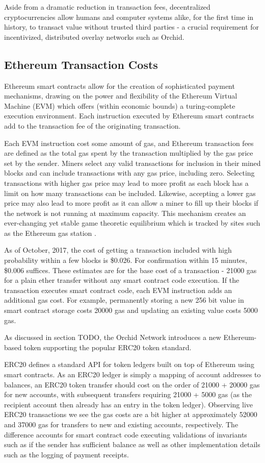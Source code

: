 Aside from a dramatic reduction in transaction fees, decentralized cryptocurrencies allow humans and computer systems alike, for the first time in history, to transact value without trusted third parties - a crucial requirement for incentivized, distributed overlay networks such as Orchid.

\subsection{Ethereum Transaction Costs}

Ethereum smart contracts allow for the creation of sophisticated payment mechanisms, drawing on the power and flexibility of the Ethereum Virtual Machine\cite{EVM} (EVM) which offers (within economic bounds) a turing-complete execution environment. Each instruction executed by Ethereum smart contracts add to the transaction fee of the originating transaction.

Each EVM instruction cost some amount of gas, and Ethereum transaction fees are defined as the total gas spent by the transaction multiplied by the gas price set by the sender. Miners select any valid transactions for inclusion in their mined blocks and can include transactions with any gas price, including zero. Selecting transactions with higher gas price may lead to more profit as each block has a limit on how many transactions can be included. Likewise, accepting a lower gas price may also lead to more profit as it can allow a miner to fill up their blocks if the network is not running at maximum capacity. This mechanism creates an ever-changing yet stable game theoretic equilibrium which is tracked by sites such as the Ethereum gas station \cite{ETHGasStation}.

As of October, 2017, the cost of getting a transaction included with high probability within a few blocks is \$0.026. For confirmation within 15 minutes, \$0.006 suffices. These estimates are for the base cost of a transaction - 21000 gas for a plain ether transfer without any smart contract code execution. If the transaction executes smart contract code, each EVM instruction adds an additional gas cost. For example, permanently storing a new 256 bit value in smart contract storage costs 20000 gas and updating an existing value costs 5000 gas.

As discussed in section TODO, the Orchid Network introduces a new Ethereum-based token supporting the popular ERC20 token standard.

ERC20 \cite{ERC20} defines a standard API for token ledgers built on top of Ethereum using smart contracts. As an ERC20 ledger is simply a mapping of account addresses to balances, an ERC20 token transfer should cost on the order of 21000 + 20000 gas for new accounts, with subsequent transfers requiring 21000 + 5000 gas (as the recipient account then already has an entry in the token ledger). Observing live ERC20 transactions \cite{LiveERC20} we see the gas costs are a bit higher at approximately 52000 and 37000 gas for transfers to new and existing accounts, respectively. The difference accounts for smart contract code executing validations of invariants such as if the sender has sufficient balance as well as other implementation details such as the logging of payment receipts.

